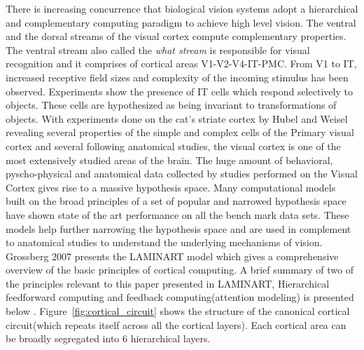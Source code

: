 \documentclass[12pt,twoside]{article}
\theoremstyle{plain}
\theoremstyle{definition}
\theoremstyle{remark}
\begin{document}
There is increasing concurrence that biological vision systems adopt a hierarchical and complementary computing paradigm \cite{Grossberg2000a}\cite{Grossberg2007} to achieve high level vision. The ventral and the dorsal streams of the visual cortex compute complementary properties. The ventral stream also called the \textit{what stream} is responsible for visual recognition and it comprises of cortical areas V1-V2-V4-IT-PMC\cite{MarkF.Bear1996}. From V1 to IT, increased receptive field sizes and complexity of the incoming stimulus has been observed. Experiments\cite{Tanak1996} show the presence of IT cells which respond selectively to objects. These cells are hypothesized as being invariant to transformations of objects. With experiments done on the cat's striate cortex by Hubel and Weisel \cite{D.H.Hubel1977}revealing several properties of the simple and complex cells of the Primary visual cortex and several following anatomical studies, the visual cortex is one of the most extensively studied areas of the brain. The huge amount of behavioral, pyscho-physical and anatomical data collected by studies performed on the Visual Cortex gives rise to a massive hypothesis space. Many computational models built on the broad principles of a set of popular and narrowed hypothesis space have shown state of the art performance on all the bench mark data sets. These models help further narrowing the hypothesis space and are used in complement to anatomical studies to understand the underlying mechanisms of vision. Grossberg 2007\cite{Grossberg2007} presents the LAMINART model which gives a comprehensive overview of the basic principles of cortical computing. A brief summary of two of the principles relevant to this paper presented in LAMINART, Hierarchical feedforward computing and feedback computing(attention modeling)\cite{Grossberg2007} is presented below . Figure~\ref{fig:cortical_circuit} shows the structure of the canonical cortical circuit(which repeats itself across all the cortical layers\cite{Grossberg2007}). Each cortical area can be broadly segregated into 6 hierarchical layers. \\
\end{document}
